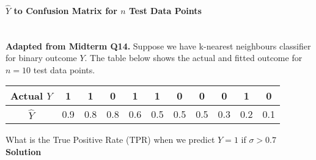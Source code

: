 \documentclass[../../dsa1101_notes.Rtex]{subfiles}\usepackage[]{graphicx}\usepackage[]{color}
\begin{document}
\paragraph{$\hat{Y}$ to Confusion Matrix for $n$ Test Data Points}\mbox{}\\
\textbf{Adapted from Midterm Q14.} Suppose we have k-nearest neighbours classifier for binary outcome \(Y\). The table below shows the actual and fitted outcome for \(n=10\) test data points.
\begin{center}
\begin{tabular}{|c|c|c|c|c|c|c|c|c|c|c|}
\hline
Actual \(Y\) & 1 & 1 & 0 & 1 & 1 & 0 & 0 & 0 & 1 & 0\\
\hline
\(\hat{Y}\) & 0.9 & 0.8 & 0.8 & 0.6 & 0.5 & 0.5 & 0.5 & 0.3 & 0.2 & 0.1\\
\hline
\end{tabular}
\end{center}
What is the True Positive Rate (TPR) when we predict \(Y=1\) if \(\sigma>0.7\)\\
\textbf{Solution}
\end{document}
